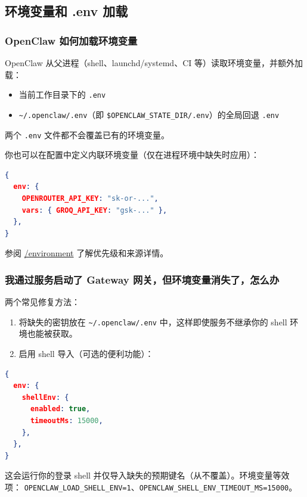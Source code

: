 \subsection{环境变量和 .env 加载}


\subsubsection{OpenClaw 如何加载环境变量}


OpenClaw 从父进程（shell、launchd/systemd、CI 等）读取环境变量，并额外加载：

\begin{itemize}
  \item 当前工作目录下的 \texttt{.env}
  \item \texttt{\textasciitilde{}/.openclaw/.env}（即 \texttt{\$OPENCLAW\_STATE\_DIR/.env}）的全局回退 \texttt{.env}
\end{itemize}


两个 \texttt{.env} 文件都不会覆盖已有的环境变量。

你也可以在配置中定义内联环境变量（仅在进程环境中缺失时应用）：

\begin{lstlisting}[language=json]
{
  env: {
    OPENROUTER_API_KEY: "sk-or-...",
    vars: { GROQ_API_KEY: "gsk-..." },
  },
}
\end{lstlisting}


参阅 \href{/help/environment}{/environment} 了解优先级和来源详情。

\subsubsection{我通过服务启动了 Gateway 网关，但环境变量消失了，怎么办}


两个常见修复方法：

\begin{enumerate}
  \item 将缺失的密钥放在 \texttt{\textasciitilde{}/.openclaw/.env} 中，这样即使服务不继承你的 shell 环境也能被获取。
  \item 启用 shell 导入（可选的便利功能）：
\end{enumerate}


\begin{lstlisting}[language=json]
{
  env: {
    shellEnv: {
      enabled: true,
      timeoutMs: 15000,
    },
  },
}
\end{lstlisting}


这会运行你的登录 shell 并仅导入缺失的预期键名（从不覆盖）。环境变量等效项：
\texttt{OPENCLAW\_LOAD\_SHELL\_ENV=1}、\texttt{OPENCLAW\_SHELL\_ENV\_TIMEOUT\_MS=15000}。

